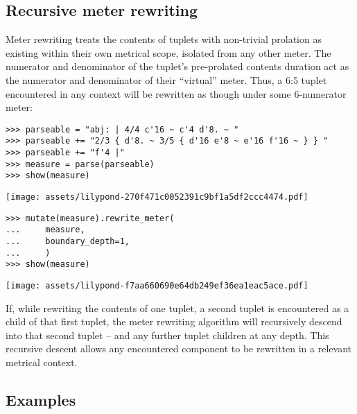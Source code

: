 \subsection{Recursive meter rewriting} %

Meter rewriting treats the contents of tuplets with non-trivial prolation as
existing within their own metrical scope, isolated from any other meter. The
numerator and denominator of the tuplet's pre-prolated contents duration act as
the numerator and denominator of their \enquote{virtual} meter. Thus, a 6:5
tuplet encountered in any context will be rewritten as though under some
6-numerator meter:

\begin{comment}
<abjad>
parseable = "abj: | 4/4 c'16 ~ c'4 d'8. ~ "
parseable += "2/3 { d'8. ~ 3/5 { d'16 e'8 ~ e'16 f'16 ~ } } "
parseable += "f'4 |"
measure = parse(parseable)
show(measure)
mutate(measure).rewrite_meter(
    measure,
    boundary_depth=1,
    )
show(measure)
</abjad>
\end{comment}

\begin{singlespacing}
\vspace{-0.5\baselineskip}
\begin{lstlisting}
>>> parseable = "abj: | 4/4 c'16 ~ c'4 d'8. ~ "
>>> parseable += "2/3 { d'8. ~ 3/5 { d'16 e'8 ~ e'16 f'16 ~ } } "
>>> parseable += "f'4 |"
>>> measure = parse(parseable)
>>> show(measure)
\end{lstlisting}
\noindent\texttt{[image: assets/lilypond-270f471c0052391c9bf1a5df2ccc4474.pdf]}
\begin{lstlisting}
>>> mutate(measure).rewrite_meter(
...     measure,
...     boundary_depth=1,
...     )
>>> show(measure)
\end{lstlisting}
\noindent\texttt{[image: assets/lilypond-f7aa660690e64db249ef36ea1eac5ace.pdf]}
\end{singlespacing}

\noindent If, while rewriting the contents of one tuplet, a second tuplet is
encountered as a child of that first tuplet, the meter rewriting algorithm will
recursively descend into that second tuplet -- and any further tuplet children
at any depth. This recursive descent allows any encountered component to be
rewritten in a relevant metrical context.

\subsection{Examples}

